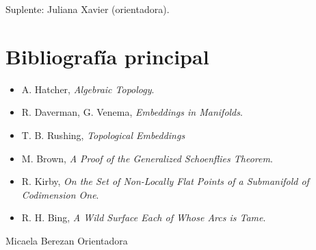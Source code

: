 \documentclass[11pt]{article}
\begin{document}
\noindent Suplente: Juliana Xavier (orientadora).





    

    

\section*{Bibliografía principal}

\begin{itemize}
    \item A. Hatcher, \emph{Algebraic Topology}.
    \item R. Daverman, G. Venema, \emph{Embeddings in Manifolds}.
    \item T. B. Rushing, \emph{Topological Embeddings}
    \item M. Brown, \emph{A Proof of the Generalized Schoenflies Theorem}.
    \item R. Kirby, \emph{On the Set of Non-Locally Flat Points of a Submanifold of Codimension One}.
    \item R. H. Bing, \emph{A Wild Surface Each of Whose Arcs is Tame}.
\end{itemize}

\vspace{2cm}

\begin{flushright}
Micaela Berezan \hfill Orientadora 
\end{flushright}
\end{document}
